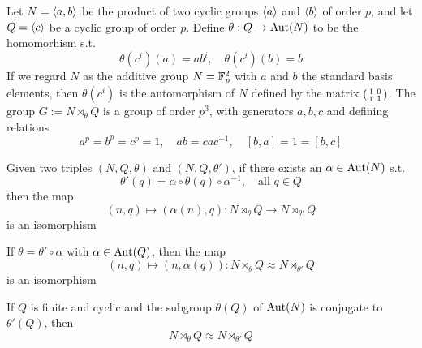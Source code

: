 \documentclass[11pt]{article}
\begin{document}
\begin{examplle}
\label{3.15}
Let \(N=\langle a,b\rangle\) be the product of two cyclic groups \(\langle a\rangle\) and \(\langle b\rangle\) of order \(p\), and
let \(Q=\langle c\rangle\) be a cyclic group of order \(p\). Define \(\theta:Q\to\operatorname{\text{Aut}}(N)\) to be the homomorhism
s.t.
\begin{equation*}
\theta(c^i)(a)=ab^i,\quad \theta(c^i)(b)=b
\end{equation*}
If we regard \(N\) as the additive group \(N=\mathbb{F}_p^2\) with \(a\) and \(b\) the standard basis
elements, then \(\theta(c^i)\) is the automorphism of \(N\) defined by the
matrix \(\begin{psmallmatrix}1&0\\i&1\end{psmallmatrix}\). The group \(G:=N\rtimes_\theta Q\) is a
group of order \(p^3\), with generators \(a,b,c\) and defining relations
\begin{equation*}
a^p=b^p=c^p=1,\quad ab=cac^{-1},\quad [b,a]=1=[b,c]
\end{equation*}
\end{examplle}

\begin{lemma}[]
Given two triples \((N,Q,\theta)\) and \((N,Q,\theta')\),  if there exists an \(\alpha\in\operatorname{\text{Aut}}(N)\) s.t.
\begin{equation*}
\theta'(q)=\alpha\circ\theta(q)\circ\alpha^{-1},\quad\text{all }q\in Q
\end{equation*}
then the map
\begin{equation*}
(n,q)\mapsto(\alpha(n),q):N\rtimes_\theta Q\to N\rtimes_{\theta'}Q
\end{equation*}
is an isomorphism
\end{lemma}

\begin{lemma}[]
If \(\theta=\theta'\circ\alpha\) with \(\alpha\in\operatorname{\text{Aut}}(Q)\), then the map
\begin{equation*}
(n,q)\mapsto(n,\alpha(q)):N\rtimes_\theta Q\approx N\rtimes_{\theta'}Q
\end{equation*}
is an isomorphism
\end{lemma}

\begin{lemma}[]
If \(Q\) is finite and cyclic and the subgroup \(\theta(Q)\) of \(\operatorname{\text{Aut}}(N)\) is conjugate
to \(\theta'(Q)\), then
\begin{equation*}
N\rtimes_\theta Q\approx N\rtimes_{\theta'}Q
\end{equation*}
\end{lemma}
\end{document}
